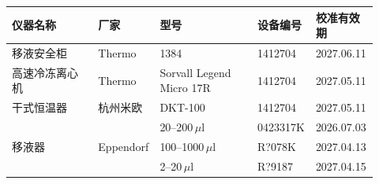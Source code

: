 \documentclass[UTF8,10pt,a4paper,fontset=fandol]{ctexart}
\newcommand{\fieldvalue}[1]{#1}
\newcommand{\handwritten}[1]{#1}
\begin{document}
\begin{center}
\begin{tabular}{|p{0.24\linewidth}|p{0.12\linewidth}|p{0.27\linewidth}|p{0.12\linewidth}|p{0.17\linewidth}|}
\hline
仪器名称 & 厂家 & 型号 & 设备编号 & 校准有效期\\
\hline
移液安全柜 & Thermo & 1384 &
\fieldvalue{\handwritten{1412704}} &
\fieldvalue{\handwritten{2027.06.11}}\\
\hline
高速冷冻离心机 & Thermo & Sorvall Legend Micro 17R &
\fieldvalue{\handwritten{1412704}} &
\fieldvalue{\handwritten{2027.05.11}}\\
\hline
干式恒温器 & 杭州米欧 & DKT-100 &
\fieldvalue{\handwritten{1412704}} &
\fieldvalue{\handwritten{2027.05.11}}\\
\hline
\multirow{3}{*}{移液器} & \multirow{3}{*}{Eppendorf} &
\fieldvalue{\handwritten{20--200\,$\mu$l}} &
\fieldvalue{\handwritten{0423317K}} &
\fieldvalue{\handwritten{2026.07.03}}\\
\cline{3-5}
& &
\fieldvalue{\handwritten{100--1000\,$\mu$l}} &
\fieldvalue{\handwritten{R?078K}} &
\fieldvalue{\handwritten{2027.04.13}}\\
\cline{3-5}
& &
\fieldvalue{\handwritten{2--20\,$\mu$l}} &
\fieldvalue{\handwritten{R?9187}} &
\fieldvalue{\handwritten{2027.04.15}}\\
\hline
\end{tabular}
\end{center}
\end{document}
